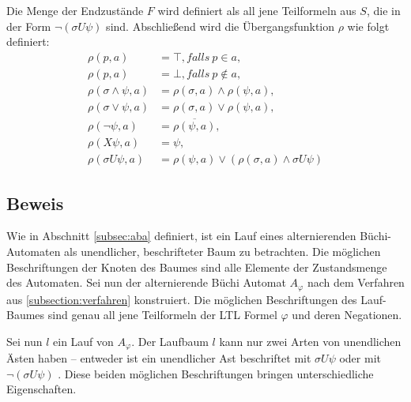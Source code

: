 Die Menge der Endzustände $F$ wird definiert als all jene Teilformeln aus $S$, die in der Form $\lnot(\sigma U\psi)$ sind. Abschließend wird die Übergangsfunktion $\rho$ wie folgt definiert:
\begin{equation}
\label{aba-zu-ltl:transitionsfunktion}
\begin{split}
    \rho(p, a) &= \top, falls \ p \in a,\\
    \rho(p, a) &= \bot, falls \ p \not\in a,\\
    \rho(\sigma \land \psi, a) &= \rho(\sigma, a) \land \rho(\psi, a),\\
    \rho(\sigma \lor \psi, a) &= \rho(\sigma, a) \lor \rho(\psi, a),\\
    \rho(\lnot\psi, a) &= \overline{\rho(\psi, a)},\\
    \rho(X\psi, a) &= \psi,\\
    \rho(\sigma U\psi, a) &= \rho(\psi, a) \lor (\rho(\sigma, a) \land \sigma U\psi)
\end{split}
\end{equation}


\subsection{Beweis}

Wie in Abschnitt \ref{subsec:aba} definiert, ist ein Lauf eines alternierenden Büchi-Automaten als unendlicher, beschrifteter Baum zu betrachten. Die möglichen Beschriftungen der Knoten des Baumes sind alle Elemente der Zustandsmenge des Automaten. Sei nun der alternierende Büchi Automat $A_\varphi$ nach dem Verfahren aus \ref{subsection:verfahren} konstruiert. Die möglichen Beschriftungen des Lauf-Baumes sind genau all jene Teilformeln der LTL Formel $\varphi$ und deren Negationen.

Sei nun $l$ ein Lauf von $A_\varphi$. Der Laufbaum $l$ kann nur zwei Arten von unendlichen Ästen haben -- entweder ist ein unendlicher Ast beschriftet mit $\sigma U\psi$ oder mit $\lnot(\sigma U\psi)$ \cite{vardi+96}. Diese beiden möglichen Beschriftungen bringen unterschiedliche Eigenschaften. 

